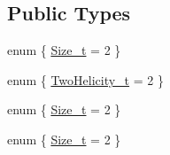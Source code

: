\subsection*{Public Types}
\begin{DoxyCompactItemize}
\item 
enum \{ \mbox{\hyperlink{structHadron_1_1H1D3E2Rep_a75d51e7c21ff09d96cb6352c117e4e3fa787c8e44fae34ae592fc4d7d7e7c83b8}{Size\+\_\+t}} = 2
 \}
\item 
enum \{ \mbox{\hyperlink{structHadron_1_1H1D3E2Rep_a94a69f27b4411ba2f2e87a3202a37b8ead01dd9a97cfd6a73e446ba14d366c461}{Two\+Helicity\+\_\+t}} = 2
 \}
\item 
enum \{ \mbox{\hyperlink{structHadron_1_1H1D3E2Rep_a75d51e7c21ff09d96cb6352c117e4e3fa787c8e44fae34ae592fc4d7d7e7c83b8}{Size\+\_\+t}} = 2
 \}
\item 
enum \{ \mbox{\hyperlink{structHadron_1_1H1D3E2Rep_a75d51e7c21ff09d96cb6352c117e4e3fa787c8e44fae34ae592fc4d7d7e7c83b8}{Size\+\_\+t}} = 2
 \}
\end{DoxyCompactItemize}
